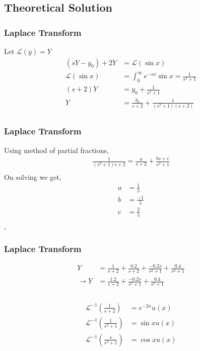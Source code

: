 \documentclass{beamer}
\providecommand{\brak}[1]{\ensuremath{\left(#1\right)}}
\theoremstyle{remark}
\newcommand{\myvec}[1]{\ensuremath{\begin{pmatrix}#1\end{pmatrix}}}
\let\vec\mathbf
\numberwithin{equation}{section}
\begin{document}
\subsection{Theoretical Solution}
\begin{frame}
\frametitle{Laplace Transform}
Let $\mathcal{L}\brak{y} = Y$\\
\begin{align}
    \brak{sY - y_0} +2Y &= \mathcal{L}\brak{\sin x}\\
    \mathcal{L}\brak{\sin x} &= \int_{0}^{\infty} e^{-sx}\sin x = \frac{1}{s^2 + 1}\\
    \brak{s + 2}Y &= y_0 + \frac{1}{s^2 + 1}\\
    Y &= \frac{y_0}{s + 2} + \frac{1}{\brak{s^2+1}\brak{s+2}}\\
\end{align}

\end{frame}
\begin{frame}
\frametitle{Laplace Transform}
 Using method of partial fractions,
    \begin{align}   
        \frac{1}{\brak{s^2+1}{s+2}} = \frac{a}{s+2} + \frac{bs + c}{s^2+1}\\
    \end{align}
    On solving we get,
    \begin{align}
        a &= \frac{1}{5}\\
        b &= \frac{-1}{5}\\
        c &= \frac{2}{5}\\
    \end{align}
    ,\\
\end{frame}
\begin{frame}
\frametitle{Laplace Transform}
\begin{align}
    Y &= \frac{1}{s + 2} + \frac{0.2}{s+2} + \frac{-0.2s}{s^2 + 1} + \frac{0.4}{s^2 + 1}\\
    \xrightarrow{} Y &=  \frac{1.2}{s + 2} + \frac{-0.2s}{s^2 + 1} + \frac{0.4}{s^2 + 1}\\
\end{align}
    \\
\begin{align}
    \mathcal{L}^{-1}\brak{\frac{1}{s+2}} &= e^{-2x}u\brak{x}\\
    \mathcal{L}^{-1}\brak{\frac{1}{s^2+1}} &= \sin xu\brak{x}\\
    \mathcal{L}^{-1}\brak{\frac{s}{s^2+1}} &= \cos xu\brak{x}
\end{align}

\end{frame}
\end{document}
